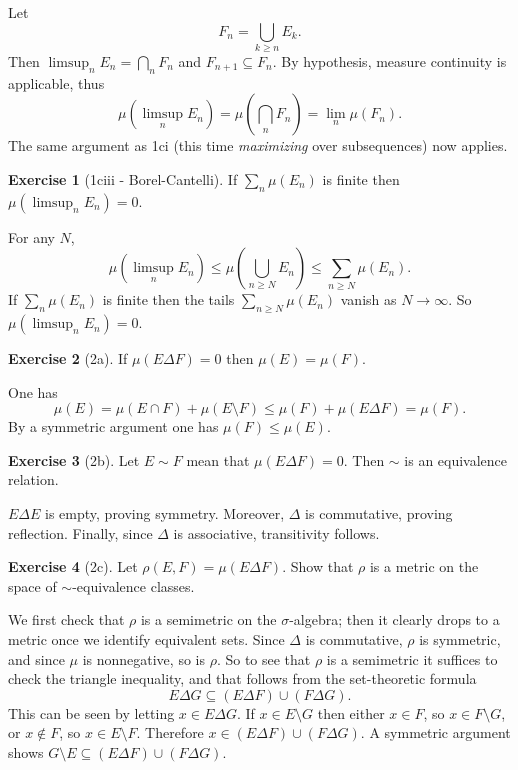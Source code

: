 \documentclass[10pt]{article}
\theoremstyle{definition}
\newtheorem{exer}{Exercise}
\begin{document}
Let
$$F_n = \bigcup_{k \geq n} E_k.$$
Then $\limsup_n E_n = \bigcap_n F_n$ and $F_{n+1} \subseteq F_n$. By hypothesis, measure continuity is applicable, thus
$$\mu\left(\limsup_n E_n\right) = \mu\left(\bigcap_n F_n\right) = \lim_n \mu(F_n).$$
The same argument as 1ci (this time \emph{maximizing} over subsequences) now applies.

\begin{exer}[1ciii - Borel-Cantelli]
If $\sum_n \mu(E_n)$ is finite then $\mu(\limsup_n E_n) = 0$.
\end{exer}

For any $N$,
$$\mu\left(\limsup_n E_n\right) \leq \mu\left(\bigcup_{n \geq N} E_n\right) \leq \sum_{n \geq N} \mu(E_n).$$
If $\sum_n \mu(E_n)$ is finite then the tails $\sum_{n \geq N} \mu(E_n)$ vanish as $N \to \infty$. So $\mu(\limsup_n E_n) = 0$.

\begin{exer}[2a]
If $\mu(E \Delta F) = 0$ then $\mu(E) = \mu(F)$.
\end{exer}

One has
$$\mu(E) = \mu(E \cap F) + \mu(E \setminus F) \leq \mu(F) + \mu(E \Delta F) = \mu(F).$$
By a symmetric argument one has $\mu(F) \leq \mu(E)$.

\begin{exer}[2b]
Let $E \sim F$ mean that $\mu(E \Delta F) = 0$. Then $\sim$ is an equivalence relation.
\end{exer}

$E \Delta E$ is empty, proving symmetry. Moreover, $\Delta$ is commutative, proving reflection. Finally, since $\Delta$ is associative, transitivity follows.

\begin{exer}[2c]
Let $\rho(E, F) = \mu(E \Delta F)$. Show that $\rho$ is a metric on the space of $\sim$-equivalence classes.
\end{exer}

We first check that $\rho$ is a semimetric on the $\sigma$-algebra; then it clearly drops to a metric once we identify equivalent sets.
Since $\Delta$ is commutative, $\rho$ is symmetric, and since $\mu$ is nonnegative, so is $\rho$.
So to see that $\rho$ is a semimetric it suffices to check the triangle inequality, and that follows from the set-theoretic formula
$$E \Delta G \subseteq (E \Delta F) \cup (F \Delta G).$$
This can be seen by letting $x \in E \Delta G$. If $x \in E \setminus G$ then either $x \in F$, so $x \in F \setminus G$, or $x \notin F$, so $x \in E \setminus F$. Therefore $x \in (E \Delta F) \cup (F \Delta G)$. A symmetric argument shows $G \setminus E \subseteq (E \Delta F) \cup (F \Delta G)$.
\end{document}
